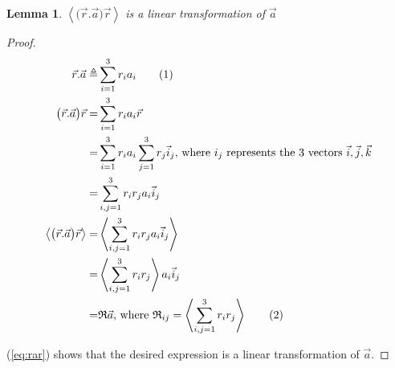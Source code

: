 \documentclass[]{article}
\newcommand\numberthis{\addtocounter{equation}{1}\tag{\theequation}}
\newtheorem{lemma}{Lemma}
\begin{document}
\begin{lemma}\label{lemma:linearity}
	$\left\langle \big(\vec{r}.\vec{a}\big)\vec{r} \right\rangle$ is a linear transformation of $\vec{a}$
\end{lemma}
\begin{proof}
\begin{align*}
\vec{r}.\vec{a} \triangleq& \sum_{i=1}^{3}r_ia_i\numberthis\label{eq:ra}\\
\big(\vec{r}.\vec{a}\big)\vec{r} =& \sum_{i=1}^{3}r_ia_i \vec{r}\\
=& \sum_{i=1}^{3}r_ia_i \sum_{j=1}^{3}r_j\vec{i}_j \text{, where $i_j$ represents the 3 vectors $\vec{i},\vec{j},\vec{k}$}\\
=& \sum_{i,j=1}^{3}r_i  r_j a_i \vec{i}_j \\
\left\langle \big(\vec{r}.\vec{a}\big)\vec{r} \right\rangle=&\left\langle \sum_{i,j=1}^{3}r_i  r_j a_i \vec{i}_j\right\rangle\\
=&\left\langle \sum_{i,j=1}^{3}r_i  r_j\right\rangle a_i \vec{i}_j\\
=&\mathfrak{R} \vec{a}\text{, where } \mathfrak{R}_{ij}=\left\langle \sum_{i,j=1}^{3}r_i  r_j\right\rangle \numberthis\label{eq:rar}
\end{align*}

(\ref{eq:rar}) shows that the desired expression is a linear transformation of $\vec{a}$.
\end{proof}
\end{document}
